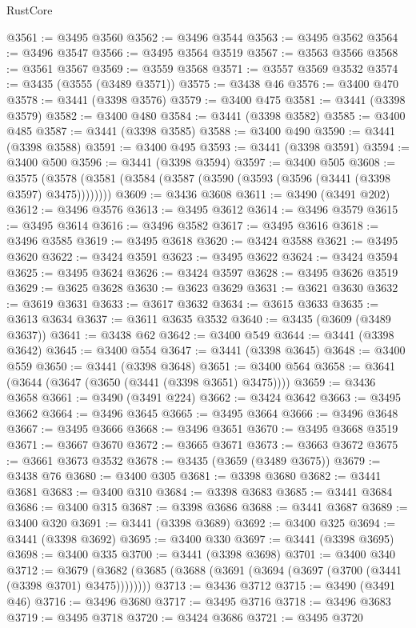\begin{lexlean}{RustCore}
\begin{coremodule}
@3561 := @3495 @3560
@3562 := @3496 @3544
@3563 := @3495 @3562
@3564 := @3496 @3547
@3566 := @3495 @3564 @3519
@3567 := @3563 @3566
@3568 := @3561 @3567
@3569 := @3559 @3568
@3571 := @3557 @3569 @3532
@3574 := @3435 (@3555 (@3489 @3571))
@3575 := @3438 @46
@3576 := @3400 @470
@3578 := @3441 (@3398 @3576)
@3579 := @3400 @475
@3581 := @3441 (@3398 @3579)
@3582 := @3400 @480
@3584 := @3441 (@3398 @3582)
@3585 := @3400 @485
@3587 := @3441 (@3398 @3585)
@3588 := @3400 @490
@3590 := @3441 (@3398 @3588)
@3591 := @3400 @495
@3593 := @3441 (@3398 @3591)
@3594 := @3400 @500
@3596 := @3441 (@3398 @3594)
@3597 := @3400 @505
@3608 := @3575 (@3578 (@3581 (@3584 (@3587 (@3590 (@3593 (@3596 (@3441 (@3398 @3597) @3475))))))))
@3609 := @3436 @3608
@3611 := @3490 (@3491 @202)
@3612 := @3496 @3576
@3613 := @3495 @3612
@3614 := @3496 @3579
@3615 := @3495 @3614
@3616 := @3496 @3582
@3617 := @3495 @3616
@3618 := @3496 @3585
@3619 := @3495 @3618
@3620 := @3424 @3588
@3621 := @3495 @3620
@3622 := @3424 @3591
@3623 := @3495 @3622
@3624 := @3424 @3594
@3625 := @3495 @3624
@3626 := @3424 @3597
@3628 := @3495 @3626 @3519
@3629 := @3625 @3628
@3630 := @3623 @3629
@3631 := @3621 @3630
@3632 := @3619 @3631
@3633 := @3617 @3632
@3634 := @3615 @3633
@3635 := @3613 @3634
@3637 := @3611 @3635 @3532
@3640 := @3435 (@3609 (@3489 @3637))
@3641 := @3438 @62
@3642 := @3400 @549
@3644 := @3441 (@3398 @3642)
@3645 := @3400 @554
@3647 := @3441 (@3398 @3645)
@3648 := @3400 @559
@3650 := @3441 (@3398 @3648)
@3651 := @3400 @564
@3658 := @3641 (@3644 (@3647 (@3650 (@3441 (@3398 @3651) @3475))))
@3659 := @3436 @3658
@3661 := @3490 (@3491 @224)
@3662 := @3424 @3642
@3663 := @3495 @3662
@3664 := @3496 @3645
@3665 := @3495 @3664
@3666 := @3496 @3648
@3667 := @3495 @3666
@3668 := @3496 @3651
@3670 := @3495 @3668 @3519
@3671 := @3667 @3670
@3672 := @3665 @3671
@3673 := @3663 @3672
@3675 := @3661 @3673 @3532
@3678 := @3435 (@3659 (@3489 @3675))
@3679 := @3438 @76
@3680 := @3400 @305
@3681 := @3398 @3680
@3682 := @3441 @3681
@3683 := @3400 @310
@3684 := @3398 @3683
@3685 := @3441 @3684
@3686 := @3400 @315
@3687 := @3398 @3686
@3688 := @3441 @3687
@3689 := @3400 @320
@3691 := @3441 (@3398 @3689)
@3692 := @3400 @325
@3694 := @3441 (@3398 @3692)
@3695 := @3400 @330
@3697 := @3441 (@3398 @3695)
@3698 := @3400 @335
@3700 := @3441 (@3398 @3698)
@3701 := @3400 @340
@3712 := @3679 (@3682 (@3685 (@3688 (@3691 (@3694 (@3697 (@3700 (@3441 (@3398 @3701) @3475))))))))
@3713 := @3436 @3712
@3715 := @3490 (@3491 @46)
@3716 := @3496 @3680
@3717 := @3495 @3716
@3718 := @3496 @3683
@3719 := @3495 @3718
@3720 := @3424 @3686
@3721 := @3495 @3720

\end{coremodule}
\end{lexlean}
